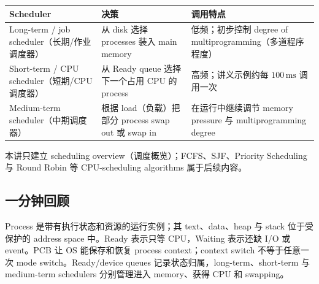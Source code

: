 \begin{center}
\small
\begin{tabularx}{\textwidth}{@{}>{\raggedright\arraybackslash}p{3.3cm}>{\raggedright\arraybackslash}p{4.2cm}X@{}}
  \toprule
  Scheduler & 决策 & 调用特点 \\
  \midrule
  Long-term / job scheduler（长期/作业调度器） & 从 disk 选择 processes 装入 main memory & 低频；初步控制 degree of multiprogramming（多道程序程度） \\
  Short-term / CPU scheduler（短期/CPU 调度器） & 从 Ready queue 选择下一个占用 CPU 的 process & 高频；讲义示例约每 $100\,\mathrm{ms}$ 调用一次 \\
  Medium-term scheduler（中期调度器） & 根据 load（负载）把部分 process swap out 或 swap in & 在运行中继续调节 memory pressure 与 multiprogramming degree \\
  \bottomrule
\end{tabularx}
\end{center}

本讲只建立 scheduling overview（调度概览）；FCFS、SJF、Priority Scheduling 与 Round Robin 等 CPU-scheduling algorithms 属于后续内容。

\subsection{一分钟回顾}

Process 是带有执行状态和资源的运行实例；其 text、data、heap 与 stack 位于受保护的 address space 中。Ready 表示只等 CPU，Waiting 表示还缺 I/O 或 event。PCB 让 OS 能保存和恢复 process context；context switch 不等于任意一次 mode switch。Ready/device queues 记录状态归属，long-term、short-term 与 medium-term schedulers 分别管理进入 memory、获得 CPU 和 swapping。
